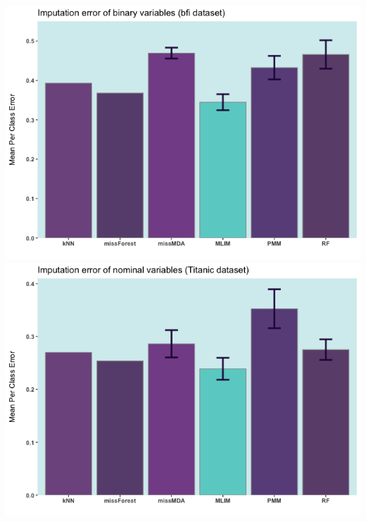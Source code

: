 \hspace{-30pt}\includegraphics[scale=.3]{figures/bfi_binary_p15.png}
\includegraphics[scale=.3]{figures/titanic_mpce_p15.png}


